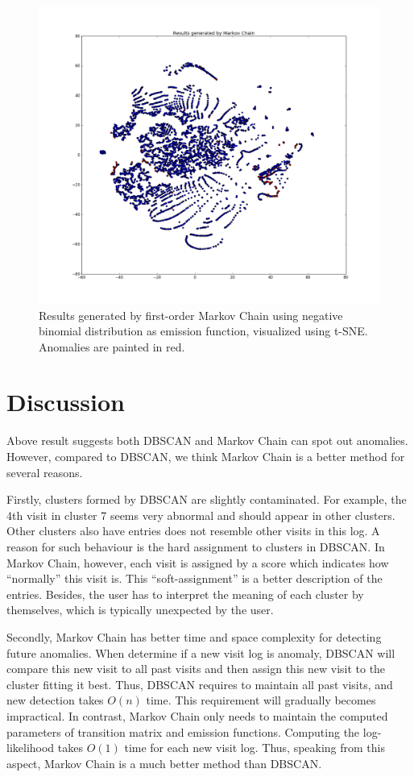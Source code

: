 \begin{figure}[!ht]
	\begin{center}
		\includegraphics[width=\textwidth]{images/MarkovResult}
		\caption{Results generated by first-order Markov Chain using negative binomial distribution as emission function, visualized using t-SNE. Anomalies are painted in red.}
		\label{fig:MarkovResult}
	\end{center}
\end{figure}

\section{Discussion}
\label{sec:discuss}
Above result suggests both DBSCAN and Markov Chain can spot out anomalies. However, compared to DBSCAN, we think Markov Chain is a better method for several reasons. 

Firstly, clusters formed by DBSCAN are slightly contaminated. For example, the 4th visit in cluster 7 seems very abnormal and should appear in other clusters. Other clusters also have entries does not resemble other visits in this log. A reason for such behaviour is the hard assignment to clusters in DBSCAN. In Markov Chain, however, each visit is assigned by a score which indicates how ``normally'' this visit is. This ``soft-assignment'' is a better description of the entries. Besides, the user has to interpret the meaning of each cluster by themselves, which is typically unexpected by the user.

Secondly, Markov Chain has better time and space complexity for detecting future anomalies. When determine if a new visit log is anomaly, DBSCAN will compare this new visit to all past visits and then assign this new visit to the cluster fitting it best. Thus, DBSCAN requires to maintain all past visits, and new detection takes $O(n)$ time. This requirement will gradually becomes impractical. In contrast, Markov Chain only needs to maintain the computed parameters of transition matrix and emission functions. Computing the log-likelihood takes $O(1)$ time for each new visit log. Thus, speaking from this aspect, Markov Chain is a much better method than DBSCAN.